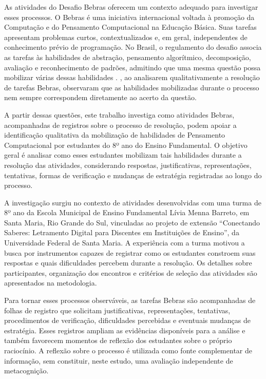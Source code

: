 As atividades do Desafio Bebras oferecem um contexto adequado para investigar esses processos. O Bebras é uma iniciativa internacional voltada à promoção da Computação e do Pensamento Computacional na Educação Básica. Suas tarefas apresentam problemas curtos, contextualizados e, em geral, independentes de conhecimento prévio de programação. No Brasil, o regulamento do desafio associa as tarefas às habilidades de abstração, pensamento algorítmico, decomposição, avaliação e reconhecimento de padrões, admitindo que uma mesma questão possa mobilizar várias dessas habilidades \cite{bebras2026}. , ao analisarem qualitativamente a resolução de tarefas Bebras, observaram que as habilidades mobilizadas durante o processo nem sempre correspondem diretamente ao acerto da questão.

A partir dessas questões, este trabalho investiga como atividades Bebras, acompanhadas de registros sobre o processo de resolução, podem apoiar a identificação qualitativa da mobilização de habilidades de Pensamento Computacional por estudantes do 8º ano do Ensino Fundamental. O objetivo geral é analisar como esses estudantes mobilizam tais habilidades durante a resolução das atividades, considerando respostas, justificativas, representações, tentativas, formas de verificação e mudanças de estratégia registradas ao longo do processo.

A investigação surgiu no contexto de atividades desenvolvidas com uma turma de 8º ano da Escola Municipal de Ensino Fundamental Lívia Menna Barreto, em Santa Maria, Rio Grande do Sul, vinculadas ao projeto de extensão ``Conectando Saberes: Letramento Digital para Discentes em Instituições de Ensino'', da Universidade Federal de Santa Maria. A experiência com a turma motivou a busca por instrumentos capazes de registrar como os estudantes constroem suas respostas e quais dificuldades percebem durante a resolução. Os detalhes sobre participantes, organização dos encontros e critérios de seleção das atividades são apresentados na metodologia.

Para tornar esses processos observáveis, as tarefas Bebras são acompanhadas de folhas de registro que solicitam justificativas, representações, tentativas, procedimentos de verificação, dificuldades percebidas e eventuais mudanças de estratégia. Esses registros ampliam as evidências disponíveis para a análise e também favorecem momentos de reflexão dos estudantes sobre o próprio raciocínio. A reflexão sobre o processo é utilizada como fonte complementar de informação, sem constituir, neste estudo, uma avaliação independente de metacognição.

